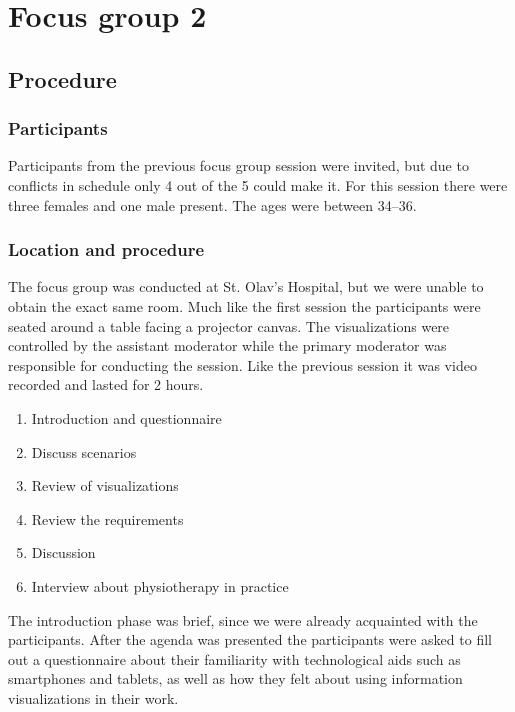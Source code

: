 \chapter{Focus group 2}
\label{ch:focusGroup2}

\section{Procedure}

\subsection{Participants}
Participants from the previous focus group session were invited, but due to conflicts in schedule only 4 out of the 5 could make it. For this session there were three females and one male present. The ages were between 34--36.

\subsection{Location and procedure}
The focus group was conducted at St. Olav's Hospital, but we were unable to obtain the exact same room.  Much like the first session the participants were seated around a table facing a projector canvas. The visualizations were controlled by the assistant moderator while the primary moderator was responsible for conducting the session. Like the previous session it was video recorded and lasted for 2 hours.

\begin{enumerate}[itemsep=0cm, parsep=0cm]
  \item Introduction and questionnaire
  \item Discuss scenarios
  \item Review of visualizations
  \item Review the requirements
  \item Discussion
  \item Interview about physiotherapy in practice
\end{enumerate}

The introduction phase was brief, since we were already acquainted with the participants. After the agenda was presented the participants were asked to fill out a questionnaire about their familiarity with technological aids such as smartphones and tablets, as well as how they felt about using information visualizations in their work. 

